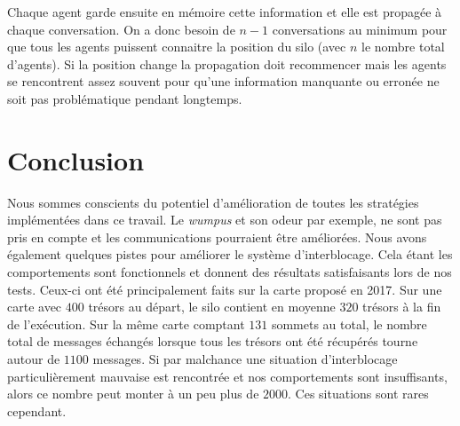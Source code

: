 \documentclass[11pt]{article}
\begin{document}
Chaque agent garde ensuite en mémoire cette information et elle est propagée à chaque conversation. On a donc besoin de $n-1$ conversations au minimum pour que tous les agents puissent connaitre la position du silo (avec $n$ le nombre total d'agents). Si la position change la propagation doit recommencer mais les agents se rencontrent assez souvent pour qu'une information manquante ou erronée ne soit pas problématique pendant longtemps.
\section{Conclusion}

Nous sommes conscients du potentiel d'amélioration de toutes les stratégies implémentées dans ce travail. Le \textit{wumpus} et son odeur par exemple, ne sont pas pris en compte et les communications pourraient être améliorées. Nous avons également quelques pistes pour améliorer le système d'interblocage. Cela étant les comportements sont fonctionnels et donnent des résultats satisfaisants lors de nos tests. Ceux-ci ont été principalement faits sur la carte proposé en 2017. Sur une carte avec $400$ trésors au départ, le silo contient en moyenne $320$ trésors à la fin de l'exécution. Sur la même carte comptant $131$ sommets au total, le nombre total de messages échangés lorsque tous les trésors ont été récupérés tourne autour de $1100$ messages. Si par malchance une situation d'interblocage particulièrement mauvaise est rencontrée et nos comportements sont insuffisants, alors ce nombre peut monter à un peu plus de $2000$. Ces situations sont rares cependant.
\end{document}
